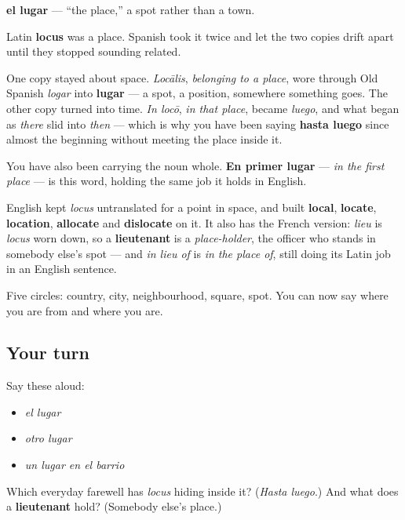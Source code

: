 \begin{cousinweb}
\textbf{el lugar} — \textquotedblleft{}the place,\textquotedblright{} a spot rather than a town.

Latin \textbf{locus} was a place. Spanish took it twice and let the two copies drift apart until they stopped sounding related.

One copy stayed about space. \emph{Locālis}, \emph{belonging to a place}, wore through Old Spanish \emph{logar} into \textbf{lugar} — a spot, a position, somewhere something goes. The other copy turned into time. \emph{In locō}, \emph{in that place}, became \emph{luego}, and what began as \emph{there} slid into \emph{then} — which is why you have been saying \textbf{hasta luego} since almost the beginning without meeting the place inside it.

You have also been carrying the noun whole. \textbf{En primer lugar} — \emph{in the first place} — is this word, holding the same job it holds in English.

English kept \emph{locus} untranslated for a point in space, and built \textbf{local}, \textbf{locate}, \textbf{location}, \textbf{allocate} and \textbf{dislocate} on it. It also has the French version: \emph{lieu} is \emph{locus} worn down, so a \textbf{lieutenant} is a \emph{place-holder}, the officer who stands in somebody else's spot — and \emph{in lieu of} is \emph{in the place of}, still doing its Latin job in an English sentence.
\end{cousinweb}

\begin{grammarlens}[title={What you've built}]
Five circles: country, city, neighbourhood, square, spot. You can now say where you are from and where you are.
\end{grammarlens}

\subsection*{Your turn}
Say these aloud:

\begin{itemize}
\raggedright
  \item \emph{el lugar}
  \item \emph{otro lugar}
  \item \emph{un lugar en el barrio}
\end{itemize}

\begin{tcolorbox}[breakable,colback=teal!4,colframe=teal!35!black,title={Before you move on}]
Which everyday farewell has \emph{locus} hiding inside it? (\emph{Hasta luego}.) And what does a \textbf{lieutenant} hold? (Somebody else's place.)
\end{tcolorbox}
